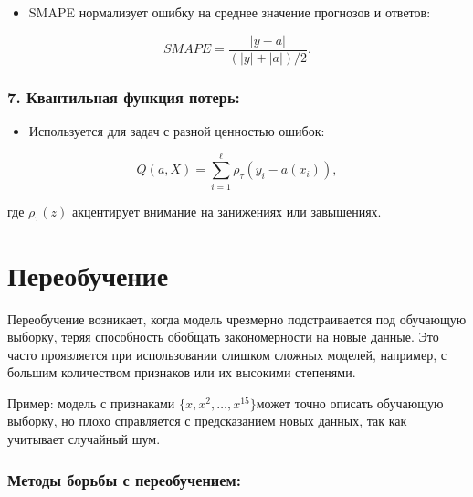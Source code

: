 \begin{itemize}
\tightlist
\item
  SMAPE нормализует ошибку на среднее значение прогнозов и
  ответов:
\end{itemize}

\begin{equation}
SMAPE = \frac{|y - a|}{(|y| + |a|)/2}.
\end{equation}

\hypertarget{ux43aux432ux430ux43dux442ux438ux43bux44cux43dux430ux44f-ux444ux443ux43dux43aux446ux438ux44f-ux43fux43eux442ux435ux440ux44c}{%
\subsubsection*{7. Квантильная функция
потерь:}\label{ux43aux432ux430ux43dux442ux438ux43bux44cux43dux430ux44f-ux444ux443ux43dux43aux446ux438ux44f-ux43fux43eux442ux435ux440ux44c}}

\begin{itemize}
\tightlist
\item
  Используется для задач с разной ценностью ошибок:
\end{itemize}

\begin{equation}
Q(a, X) = \sum_{i=1}^{\ell} \rho_\tau(y_i - a(x_i)),
\end{equation}

где \(\rho_\tau(z)\) акцентирует внимание на занижениях или завышениях.

\hypertarget{ux43fux435ux440ux435ux43eux431ux443ux447ux435ux43dux438ux435}{%
\section{Переобучение}\label{ux43fux435ux440ux435ux43eux431ux443ux447ux435ux43dux438ux435}}

Переобучение возникает, когда модель чрезмерно подстраивается под
обучающую выборку, теряя способность обобщать закономерности на новые
данные. Это часто проявляется при использовании слишком сложных моделей,
например, с большим количеством признаков или их высокими степенями.

Пример: модель с признаками \(\{x, x^2, \dots, x^{15}\}\)может
точно описать обучающую выборку, но плохо справляется с предсказанием
новых данных, так как учитывает случайный шум.

\hypertarget{ux43cux435ux442ux43eux434ux44b-ux431ux43eux440ux44cux431ux44b-ux441-ux43fux435ux440ux435ux43eux431ux443ux447ux435ux43dux438ux435ux43c}{%
\subsubsection*{Методы борьбы с
переобучением:}\label{ux43cux435ux442ux43eux434ux44b-ux431ux43eux440ux44cux431ux44b-ux441-ux43fux435ux440ux435ux43eux431ux443ux447ux435ux43dux438ux435ux43c}}

